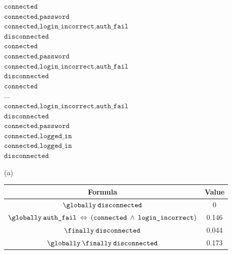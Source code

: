 \newcommand{\vertic}[1]{ {\scriptsize $\texttt{#1}$} }

\begin{figure*}[t]
  \begin{minipage}{0.4\linewidth}
    \scriptsize
    $\texttt{connected}$\\
    $\texttt{connected,password}$\\
    $\texttt{connected,login\_incorrect,auth\_fail}$\\
    $\texttt{disconnected}$\\
    $\texttt{connected}$\\
    $\texttt{connected,password}$\\
    $\texttt{connected,login\_incorrect,auth\_fail}$\\
    $\texttt{disconnected}$\\
    $\texttt{connected}$\\
    $\texttt{...}$\\
    $\texttt{connected,login\_incorrect,auth\_fail}$\\
    $\texttt{disconnected}$\\
    $\texttt{connected,password}$\\
    $\texttt{connected,logged\_in}$\\
    $\texttt{connected,logged\_in}$\\
    $\texttt{disconnected}$
    \vspace{-4mm}
  \begin{center} \normalsize(a) \end{center}
\end{minipage}
\begin{minipage}{0.54\linewidth}
  \center
  \scriptsize
  \begin{tabular}[t]{c c}\hline
    Formula & Value \\\hline
    $\globally\: \texttt{disconnected}$ & 0 \\
    $\globally \:\texttt{auth\_fail}\:\Leftrightarrow\: (\texttt{connected}\: \land\:\texttt{login\_incorrect})$ & 0.146\\
    $\finally\: \texttt{disconnected}$ & 0.044\\
    $\globally\: \finally\: \texttt{disconnected}$ & 0.173\\

\end{tabular}
\end{minipage}
\end{figure*}

